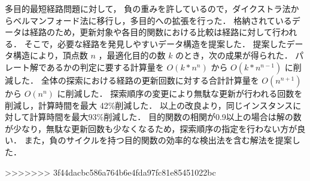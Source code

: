 \documentclass[oneside, 10pt, twocolumn]{jarticle}
\begin{document}
多目的最短経路問題に対して，
負の重みを許しているので，ダイクストラ法からベルマンフォード法に移行し，多目的への拡張を行った．
格納されているデータは経路のため，更新対象や各目的関数における比較は経路に対して行われる．
そこで，必要な経路を発見しやすいデータ構造を提案した．
提案したデータ構造により，頂点数 $n$ ，最適化目的の数 $k$ のとき，次の成果が得られた．
パレート解であるかの判定に要する計算量を $O(k*n^n)$ から $O(k*n^{n-1})$ に削減した．
全体の探索における経路の更新回数に対する合計計算量を $O(n^{n+1})$ から $O(n^n)$ に削減した．
探索順序の変更により無駄な更新が行われる回数を削減し，計算時間を最大 42\%削減した．
以上の改良より，同じインスタンスに対して計算時間を最大93\%削減した．
目的関数の相関が0.9以上の場合は解の数が少なり，無駄な更新回数も少なくなるため，探索順序の指定を行わない方が良い．
また，負のサイクルを持つ目的関数の効率的な検出法を含む解法を提案した．

%
%
%
%
%
%
%
%
>>>>>>> 3f44dacbc586a764b6e4fda97fc81e85451022bc
\end{document}
